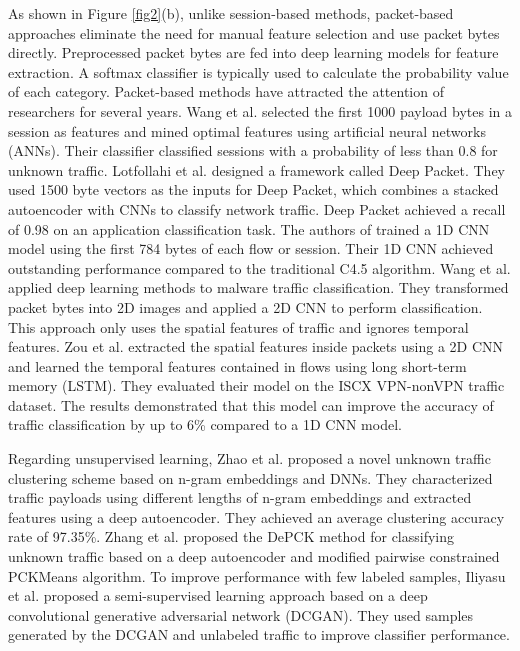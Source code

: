 \documentclass[preprint,12pt]{elsarticle}
\begin{document}
As shown in Figure \ref{fig2}(b), unlike session-based methods, packet-based approaches eliminate the need for manual feature selection and use packet bytes directly. Preprocessed packet bytes are fed into deep learning models for feature extraction. A softmax classifier is typically used to calculate the probability value of each category. Packet-based methods have attracted the attention of researchers for several years. Wang et al. \cite{wang2015applications} selected the first 1000 payload bytes in a session as features and mined optimal features using artificial neural networks (ANNs). Their classifier classified sessions with a probability of less than 0.8 for unknown traffic. Lotfollahi et al. \cite{lotfollahi2017deep} designed a framework called Deep Packet. They used 1500 byte vectors as the inputs for Deep Packet, which combines a stacked autoencoder with CNNs to classify network traffic. Deep Packet achieved a recall of 0.98 on an application classification task. The authors of \cite{wang2017end} trained a 1D CNN model using the first 784 bytes of each flow or session. Their 1D CNN achieved outstanding performance compared to the traditional C4.5 algorithm. Wang et al. \cite{wang2017malware} applied deep learning methods to malware traffic classification. They transformed packet bytes into 2D images and applied a 2D CNN to perform classification. This approach only uses the spatial features of traffic and ignores temporal features. Zou et al. \cite{zou2018encrypted} extracted the spatial features inside packets using a 2D CNN and learned the temporal features contained in flows using long short-term memory (LSTM). They evaluated their model on the ISCX VPN-nonVPN traffic dataset. The results demonstrated that this model can improve the accuracy of traffic classification by up to 6\% compared to a 1D CNN model. 

Regarding unsupervised learning, Zhao et al. \cite{DBLP:conf/ict/Zhao0S19} proposed a novel unknown traffic clustering scheme based on n-gram embeddings and DNNs. They characterized traffic payloads using different lengths of n-gram embeddings and extracted features using a deep autoencoder. They achieved an average clustering accuracy rate of 97.35\%. Zhang et al. \cite{iccS/Zhang} proposed the DePCK method for classifying unknown traffic based on a deep autoencoder and modified pairwise constrained PCKMeans algorithm. To improve performance with few labeled samples, Iliyasu et al. \cite{Iliyasu} proposed a semi-supervised learning approach based on a deep convolutional generative adversarial network (DCGAN). They used samples generated by the DCGAN and unlabeled traffic to improve classifier performance.
\end{document}
